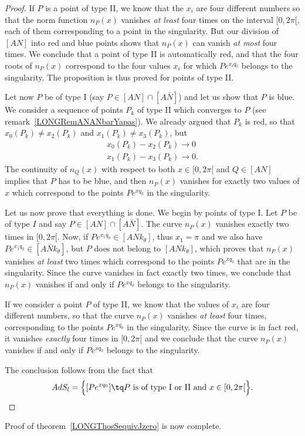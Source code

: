 \begin{proof}
If $P$ is a point of type II, we know that the $x_i$ are four different numbers so that the norm function $n_P(x)$ vanishes \emph{at least} four times on the interval $\mathopen[ 0 , 2\pi [$, each of them corresponding to a point in the singularity. But our division of $[AN]$ into red and blue points shows that $n_P(x)$ can vanish \emph{at most} four times. We conclude that a point of type II is automatically red, and that the four roots of $n_P(x)$ correspond to the four values $x_i$ for which $P e^{x_iq_0}$ belongs to the singularity. The proposition is thus proved for points of type II.

Let now $P$ be of type I (say $P\in [AN]\cap [A\bar N]$) and let us show that $P$ is blue. We consider a sequence of points $P_k$ of type II which converges to $P$ (see remark~\ref{LONGRemANANbarYapas}). We already argued that $P_k$ is red, so that $x_0(P_k)\neq x_2(P_k)$ and $x_1(P_k)\neq x_3(P_k)$, but
\begin{subequations}
    \begin{align}
        x_0(P_k)-x_2(P_k)\to 0\\
        x_1(P_k)-x_3(P_k)\to 0.
    \end{align}
\end{subequations}
The continuity of $n_Q(x)$ with respect to both $x\in\mathopen[ 0 , 2\pi [$ and $Q\in[AN]$ implies that $P$ has to be blue, and then $n_P(x)$ vanishes for exactly two values of $x$ which correspond to the points $P e^{xq_0}$ in the singularity.

Let us now prove that everything is done. We begin by points of type I. Let $P$ be of type $I$ and say $P\in[AN]\cap[A\bar N]$. The curve $n_P(x)$ vanishes exactly two times in $\mathopen[ 0 , 2\pi [$. Now, if $P e^{x_1 q_0}\in[ANk_{\theta}]$, thus $x_1 = \pi$ and we also have $P e^{x_1q_0}\in[A\bar Nk_{\theta}]$, but $P$ does not belong to $[ANk_{\theta}]$, which proves that $n_P(x)$ vanishes \emph{at least} two times which correspond to the points $P e^{xq_0}$ that are in the singularity. Since the curve vanishes in fact exactly two times, we conclude that $n_P(x)$ vanishes if and only if $P e^{xq_0}$ belongs to the singularity.

If we consider a point $P$ of type II, we know that the values of $x_i$ are four different numbers, so that the curve $n_P(x)$ vanishes \emph{at least} four times, corresponding to the points $P e^{xq_0}$ in the singularity. Since the curve is in fact red, it vanishes \emph{exactly} four times in $\mathopen[ 0 , 2\pi [$ and we conclude that the curve $n_P(x)$ vanishes if and only if $P e^{xq_0}$ belongs to the singularity.

The conclusion follows from the fact that
\begin{equation}
    AdS_l=\Big\{ [P e^{xq_0}] \tq P \text{ is of type I or II and  } x\in\mathopen[ 0 , 2\pi [ \Big\}.
\end{equation}
\end{proof}
Proof of theorem~\ref{LONGThosSequivJzero} is now complete.


